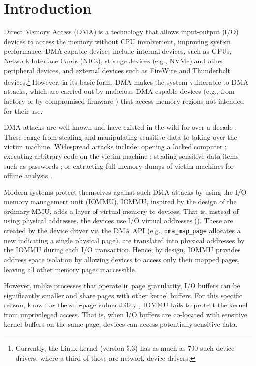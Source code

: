 \section{Introduction}

Direct Memory Access (DMA) is a technology that allows input-output (I/O) devices to access the memory without CPU involvement, improving system performance.
DMA capable devices include internal devices, such as GPUs, Network Interface Cards (NICs), storage devices (e.g., NVMe) and other peripheral devices, and external devices such as FireWire and Thunderbolt devices.\footnote{Currently, the Linux kernel (version 5.3) has as much as 700 such device drivers, where a third of those are network device drivers.} However, in its basic form, DMA makes the system vulnerable to DMA attacks, which are carried out by malicious DMA capable devices (e.g., from factory or by compromised firmware \cite{Gal14,Ben17a}) that access memory regions not intended for their use. 



DMA attacks are well-known and have existed in the wild for over a decade \cite{Dor04,BDK10,thunder}. These range from stealing and manipulating sensitive data to taking over the victim machine. Widespread attacks include: opening a locked computer \cite{MM, Fin14}; executing arbitrary code on the victim machine \cite{Fri16, Woj08, AD10,thunder}; stealing sensitive data items such as passwords \cite{SB12, LKV13, Cim16, BR12}; or extracting full memory dumps of victim machines for offline analysis \cite{MM, Vol, Fin14, GA10}. 

Modern systems protect themselves against such DMA attacks by using the I/O memory management unit (IOMMU). IOMMU, inspired by the design of the ordinary MMU, adds a layer of virtual memory to devices. That is, instead of using physical addresses, the devices use I/O virtual addresses (\iova). These \iova{} are created by the device driver via the DMA API (e.g., \texttt{dma\_map\_page} allocates a new \iova{} indicating a single physical page). \iova{} are translated into physical addresses by the IOMMU during each I/O transaction. Hence, by design, IOMMU provides address space isolation by allowing devices to access only their mapped pages, leaving all other memory pages inaccessible. 

However, unlike processes that operate in page granularity, I/O buffers can be significantly smaller and share pages with other kernel buffers. For this specific reason, known as the sub-page vulnerability \cite{MMT16,thunder}, IOMMU fails to protect the kernel from unprivileged access. That is, when I/O buffers are co-located with sensitive kernel buffers on the same page, devices can access potentially sensitive data. 


